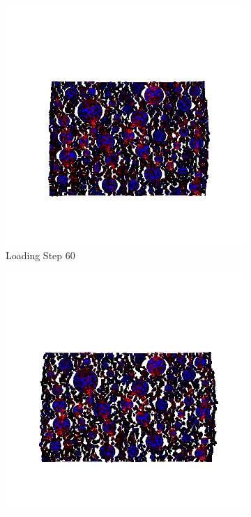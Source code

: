 \begin{figure}[ht]
    \begin{subfigure}{.33\textwidth}
      \centering
      \includegraphics[width=1.0\linewidth]{Files/A30P75_3_IS_Free/DEP50-STEP(080).png}
      \caption{Loading Step 60}
    \end{subfigure}%
    \begin{subfigure}{.33\textwidth}
      \centering
      \includegraphics[width=1.0\linewidth]{Files/A30P75_3_IS_Free/DEP50-STEP(100).png}

\end{subfigure}
\end{figure}

